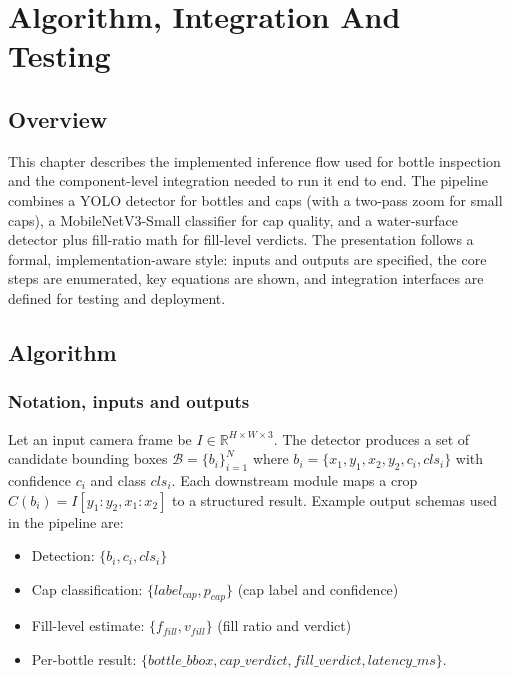 \documentclass[12pt,a4paper]{report}
\begin{document}
\chapter{Algorithm, Integration And Testing}
\label{ch:algorithm-integration}

\section{Overview}
\label{sec:alg-overview}

This chapter describes the implemented inference flow used for bottle inspection and the component-level integration needed to run it end to end. The pipeline combines a YOLO detector for bottles and caps (with a two-pass zoom for small caps), a MobileNetV3-Small classifier for cap quality, and a water-surface detector plus fill-ratio math for fill-level verdicts. The presentation follows a formal, implementation-aware style: inputs and outputs are specified, the core steps are enumerated, key equations are shown, and integration interfaces are defined for testing and deployment.

\section{Algorithm}
\label{sec:algorithm}

\subsection{Notation, inputs and outputs}
\label{subsec:notation}

Let an input camera frame be $I\in\mathbb{R}^{H\times W\times 3}$. The detector produces a set of candidate bounding boxes
$\mathcal{B}=\{b_i\}_{i=1}^{N}$ where $b_i=\{x_{1},y_{1},x_{2},y_{2},c_i,cls_i\}$ with confidence $c_i$ and class $cls_i$.
Each downstream module maps a crop $C(b_i)=I[y_{1}:y_{2},x_{1}:x_{2}]$ to a structured result. Example output schemas used in the pipeline are:

\begin{itemize}
  \item Detection: $\{b_i, c_i, cls_i\}$
  \item Cap classification: $\{label_{cap}, p_{cap}\}$ (cap label and confidence)
  \item Fill-level estimate: $\{f_{fill}, v_{fill}\}$ (fill ratio and verdict)
  \item Per-bottle result: $\{bottle\_bbox, cap\_verdict, fill\_verdict, latency\_ms\}$.
\end{itemize}
\end{document}
